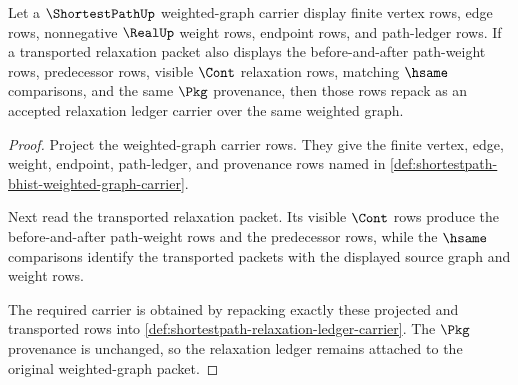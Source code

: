 \begin{theorem}
\label{thm:shortestpath-relaxation-cont-closure}
Let a $\ShortestPathUp$ weighted-graph carrier display finite vertex rows,
edge rows, nonnegative $\RealUp$ weight rows, endpoint rows, and path-ledger
rows. If a transported relaxation packet also displays the before-and-after
path-weight rows, predecessor rows, visible $\Cont$ relaxation rows, matching
$\hsame$ comparisons, and the same $\Pkg$ provenance, then those rows repack
as an accepted relaxation ledger carrier over the same weighted graph.
\end{theorem}
\begin{proof}
Project the weighted-graph carrier rows. They give the finite vertex, edge,
weight, endpoint, path-ledger, and provenance rows named in
\autoref{def:shortestpath-bhist-weighted-graph-carrier}.

Next read the transported relaxation packet. Its visible $\Cont$ rows produce
the before-and-after path-weight rows and the predecessor rows, while the
$\hsame$ comparisons identify the transported packets with the displayed
source graph and weight rows.

The required carrier is obtained by repacking exactly these projected and
transported rows into
\autoref{def:shortestpath-relaxation-ledger-carrier}. The $\Pkg$ provenance is
unchanged, so the relaxation ledger remains attached to the original
weighted-graph packet.
\end{proof}

